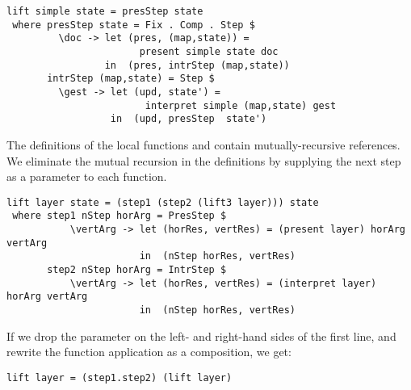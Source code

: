 \documentclass[preprint,natbib]{sigplanconf}
\begin{document}
\begin{small} %
\begin{verbatim}
lift simple state = presStep state 
 where presStep state = Fix . Comp . Step $
         \doc -> let (pres, (map,state)) = 
                       present simple state doc                                         
                 in  (pres, intrStep (map,state))
       intrStep (map,state) = Step $
         \gest -> let (upd, state') = 
                        interpret simple (map,state) gest
                  in  (upd, presStep  state')
\end{verbatim}
\end{small}

The definitions of the local functions  and  contain mutually-recursive references. We eliminate the mutual recursion in the definitions by supplying the next step as a parameter to each function.

      
      
\begin{small} %
\begin{verbatim}
lift layer state = (step1 (step2 (lift3 layer))) state
 where step1 nStep horArg = PresStep $ 
           \vertArg -> let (horRes, vertRes) = (present layer) horArg vertArg                                         
                       in  (nStep horRes, vertRes)
       step2 nStep horArg = IntrStep $
           \vertArg -> let (horRes, vertRes) = (interpret layer) horArg vertArg                     
                       in  (nStep horRes, vertRes)
\end{verbatim}
\end{small}

If we drop the  parameter on the left- and right-hand sides of the first line, and rewrite the function application as a composition, we get:
\
\begin{small}
\begin{verbatim}
lift layer = (step1.step2) (lift layer)
\end{verbatim}
\end{small}
\end{document}
